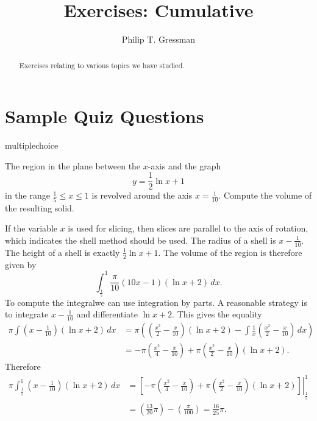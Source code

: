 \documentclass{ximera}
\title{Exercises: Cumulative}
\author{Philip T. Gressman}
\begin{document}
\begin{abstract}
Exercises relating to various topics we have studied.
\end{abstract}
\maketitle


\section*{Sample Quiz Questions}

\begin{question}[shelllogibp001]
\begin{type}
multiplechoice
\end{type}
The region in the plane between the  \(x\)-axis and the graph
\[ y = \frac{1}{2} \ln{x} + 1 \]
 in the range \(\frac{1}{5} \leq x \leq 1\) is revolved around the axis \(x = \frac{1}{10}\). Compute the volume of the resulting solid.
\begin{multiplechoice}
\end{multiplechoice}
\begin{feedback}
If the variable \(x\) is used for slicing, then slices are parallel to the axis of rotation, which indicates the shell method should be used.
The radius of a shell is \(x - \frac{1}{10}\). The height of a shell is exactly \(\frac{1}{2} \ln{x} + 1\).
The volume of the region is therefore given by
\[ \int_{\frac{1}{5}}^{1} \frac{\pi}{10} \left(10 x - 1\right) \left(\ln{x} + 2\right)\, dx. \]
 To compute the integralwe can use integration by parts. A reasonable strategy is to integrate  \(x - \frac{1}{10}\) and differentiate  \(\ln{x} + 2\).
 This gives the equality
\[ \begin{aligned} \pi \int \left(x - \frac{1}{10}\right) \left(\ln{x} + 2\right)\, dx & = \pi \left(\left(\frac{x^{2}}{2} - \frac{x}{10}\right) \left(\ln{x} + 2\right) - \int \frac{1}{x} \left(\frac{x^{2}}{2} - \frac{x}{10}\right)\, dx\right) \\
 & = - \pi \left(\frac{x^{2}}{4} - \frac{x}{10}\right) + \pi \left(\frac{x^{2}}{2} - \frac{x}{10}\right) \left(\ln{x} + 2\right). \end{aligned} \]
Therefore 
\[ \begin{aligned} \pi \int_{\frac{1}{5}}^{1} \left(x - \frac{1}{10}\right) \left(\ln{x} + 2\right)\, dx & = \left. \left[- \pi \left(\frac{x^{2}}{4} - \frac{x}{10}\right) + \pi \left(\frac{x^{2}}{2} - \frac{x}{10}\right) \left(\ln{x} + 2\right) \right] \right|_{\frac{1}{5}}^{1}\\ & = \left(\frac{13}{20} \pi \right) - \left(\frac{\pi}{100} \right) = \frac{16}{25} \pi. \end{aligned} \]

\end{feedback}
\end{question}
\end{document}
